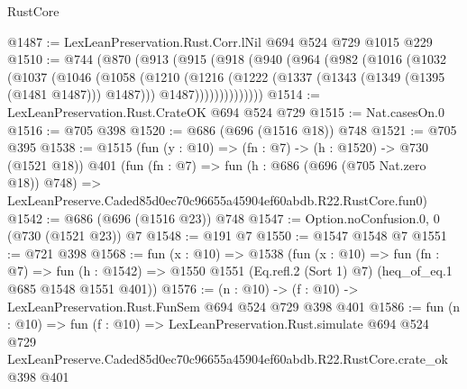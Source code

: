 \begin{lexlean}{RustCore}
\begin{coremodule}
@1487 := LexLeanPreservation.Rust.Corr.lNil @694 @524 @729 @1015 @229
@1510 := @744
    (@870
      (@913
        (@915
          (@918
            (@940
              (@964
                (@982
                  (@1016
                    (@1032
                      (@1037
                        (@1046
                          (@1058
                            (@1210
                              (@1216
                                (@1222 (@1337 (@1343 (@1349 (@1395 (@1481 @1487))) @1487)))
                                @1487))))))))))))))
@1514 := LexLeanPreservation.Rust.CrateOK @694 @524 @729
@1515 := Nat.casesOn.{0}
@1516 := @705 @398
@1520 := @686 (@696 (@1516 @18)) @748
@1521 := @705 @395
@1538 := @1515
    (fun (y : @10) => (fn : @7) -> (h : @1520) -> @730 (@1521 @18))
    @401
    (fun (fn : @7) =>
    fun (h : @686 (@696 (@705 Nat.zero @18)) @748) =>
    LexLeanPreserve.Caded85d0ec70c96655a45904ef60abdb.R22.RustCore.fun0)
@1542 := @686 (@696 (@1516 @23)) @748
@1547 := Option.noConfusion.{0, 0} (@730 (@1521 @23)) @7
@1548 := @191 @7
@1550 := @1547 @1548 @7
@1551 := @721 @398
@1568 := fun (x : @10) =>
  @1538
    (fun (x : @10) =>
    fun (fn : @7) =>
    fun (h : @1542) => @1550 @1551 (Eq.refl.{2} (Sort 1) @7) (heq_of_eq.{1} @685 @1548 @1551 @401))
@1576 := (n : @10) -> (f : @10) -> LexLeanPreservation.Rust.FunSem @694 @524 @729 @398 @401
@1586 := fun (n : @10) =>
  fun (f : @10) =>
  LexLeanPreservation.Rust.simulate
    @694
    @524
    @729
    LexLeanPreserve.Caded85d0ec70c96655a45904ef60abdb.R22.RustCore.crate_ok
    @398
    @401
\end{coremodule}
\end{lexlean}
